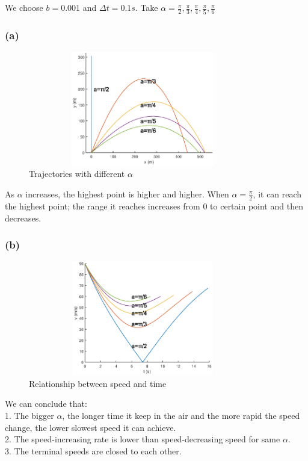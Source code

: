 \documentclass{article}
\begin{document}
\subsection{}
We choose $b=0.001$ and $\Delta t=0.1s$. Take $\alpha=\frac{\pi}{2},\frac{\pi}{3},\frac{\pi}{4},\frac{\pi}{5},\frac{\pi}{6}$
\subsubsection*{(a)}
\begin{figure}[!htb] 
\centering 
\includegraphics[height=5cm,width=10cm]{linear_figure7_1.eps}
\caption{Trajectories with different $\alpha$}
\end{figure}
As $\alpha$ increases, the highest point is higher and higher. When $\alpha=\frac{\pi}{2}$, it can reach the highest point; the range it reaches increases from 0 to certain point and then decreases.
\subsubsection*{(b)}
\begin{figure}[!htb] 
\centering 
\includegraphics[height=5cm,width=10cm]{linear_figure7_2.eps}
\caption{Relationship between speed and time}
\end{figure}
\noindent We can conclude that:\\
1. The bigger $\alpha$, the longer time it keep in the air and the more rapid the speed change, the lower slowest speed it can achieve.\\
2. The speed-increasing rate is lower than speed-decreasing speed for same $\alpha$.\\
3. The terminal speeds are closed to each other.
\newpage
\end{document}

